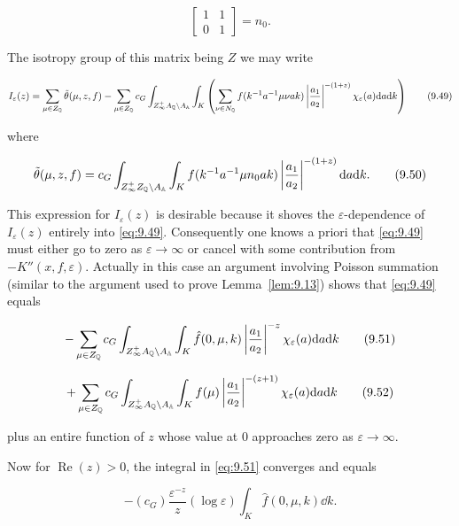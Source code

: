 \[
\begin{bmatrix} 1 & 1 \\ 0 & 1 \end{bmatrix} = n_0.
\]

The isotropy group of this matrix being $Z$ we may write

\begin{equation}\label{eq:9.49}
I_\varepsilon(z) = \sum_{\mu \in Z_{\mathbb{Q}}}\tilde{\theta}(\mu, z, f) - \sum_{\mu \in Z_{\mathbb{Q}}}c_G\int_{Z_\infty^{+}A_{\mathbb{Q}} \backslash A_{\mathbb{A}}}\int_K\left(\sum_{\nu \in N_{\mathbb{Q}}} f(k^{-1}a^{-1}\mu\nu ak)\left|\frac{a_1}{a_2}\right|^{-(1+z)}\chi_\varepsilon(a)\mathrm{d} a\mathrm{d} k\right)\tag{9.49}
\end{equation}

where

\begin{equation}\label{eq:9.50}
\tilde{\theta}(\mu, z, f) = c_G\int_{Z_\infty^{+}Z_{\mathbb{Q}} \backslash A_{\mathbb{A}}}\int_K f(k^{-1}a^{-1}\mu n_0ak)\left|\frac{a_1}{a_2}\right|^{-(1+z)}\mathrm{d} a\mathrm{d} k.\tag{9.50}
\end{equation}

This expression for $I_\varepsilon(z)$ is desirable because it shoves the $\varepsilon$-dependence of $I_\varepsilon(z)$ entirely into \eqref{eq:9.49}. Consequently one knows a priori that \eqref{eq:9.49} must either go to zero as $\varepsilon \to \infty$ or cancel with some contribution from $-K''(x, f, \varepsilon)$. Actually in this case an argument involving Poisson summation (similar to the argument used to prove Lemma~\ref{lem:9.13}) shows that \eqref{eq:9.49} equals

\begin{equation}\label{eq:9.51}
-\sum_{\mu \in Z_{\mathbb{Q}}}c_G\int_{Z_\infty^{+}A_{\mathbb{Q}} \backslash A_{\mathbb{A}}}\int_K \hat{f}(0, \mu, k)\left|\frac{a_1}{a_2}\right|^{-z}\chi_\varepsilon(a)\mathrm{d} a\mathrm{d} k\tag{9.51}
\end{equation}

\begin{equation}\label{eq:9.52}
+ \sum_{\mu \in Z_{\mathbb{Q}}}c_G\int_{Z_\infty^{+}A_{\mathbb{Q}} \backslash A_{\mathbb{A}}}\int_K f(\mu)\left|\frac{a_1}{a_2}\right|^{-(z+1)}\chi_\varepsilon(a)\mathrm{d} a\mathrm{d} k\tag{9.52}
\end{equation}

plus an entire function of $z$ whose value at 0 approaches zero as $\varepsilon \to \infty$.

Now for $\operatorname{Re}(z) > 0$, the integral in \eqref{eq:9.51} converges and equals

\[
-(c_G)\frac{\varepsilon^{-z}}{z}(\log\varepsilon)\int_K \hat{f}(0, \mu, k)\dd k.
\]

